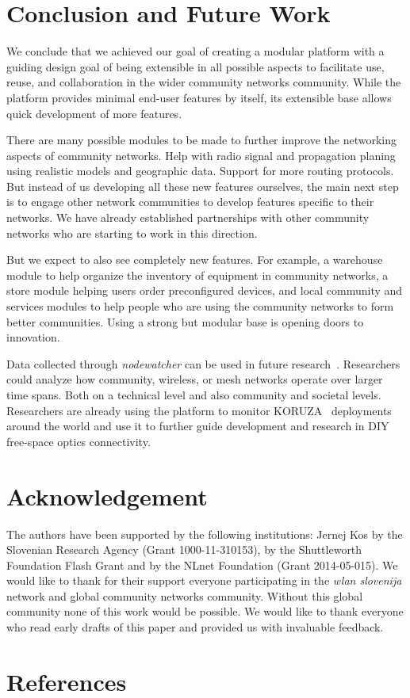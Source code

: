 \documentclass[5p,sort&compress]{elsarticle}
\newcommand{\nodewatcher}{\textit{nodewatcher}}
\newcommand{\wlanslovenija}{\textit{wlan slovenija}}
\begin{document}
\section{Conclusion and Future Work}
\label{sec:conclusion}

We conclude that we achieved our goal of creating a modular platform with a guiding design goal of being extensible in all possible aspects to facilitate use, reuse, and collaboration in the wider community networks community.
While the platform provides minimal end-user features by itself, its extensible base allows quick development of more features.

There are many possible modules to be made to further improve the networking aspects of community networks.
Help with radio signal and propagation planing using realistic models and geographic data.
Support for more routing protocols.
But instead of us developing all these new features ourselves, the main next step is to engage other network communities to develop features specific to their networks.
We have already established partnerships with other community networks who are starting to work in this direction.

But we expect to also see completely new features.
For example, a warehouse module to help organize the inventory of equipment in community networks, a store module helping users order preconfigured devices, and local community and services modules to help people who are using the community networks to form better communities.
Using a strong but modular base is opening doors to innovation.

Data collected through \nodewatcher{} can be used in future research~\cite{Braem_2013}.
Researchers could analyze how community, wireless, or mesh networks operate over larger time spans.
Both on a technical level and also community and societal levels.
Researchers are already using the platform to monitor KORUZA~\cite{Mustafa_2013} deployments around the world and use it to further guide development and research in DIY free-space optics connectivity.

\section*{Acknowledgement}

The authors have been supported by the following institutions: Jernej Kos by the Slovenian Research Agency (Grant 1000-11-310153), by the Shuttleworth Foundation Flash Grant and by the NLnet Foundation (Grant 2014-05-015).
We would like to thank for their support everyone participating in the \wlanslovenija{} network and global community networks community.
Without this global community none of this work would be possible.
We would like to thank everyone who read early drafts of this paper and provided us with invaluable feedback.

\section*{References}

\end{document}
